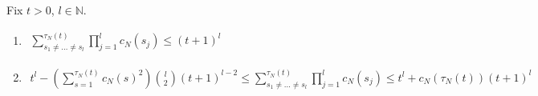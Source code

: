 \begin{lemma}\label{thm:sumprod1}
Fix $t>0$, $l\in\mathbb{N}$.
\begin{enumerate}[label=(\alph*)]
\item \label{thm:sumprod1_a} \hspace{1cm}
$\begin{aligned}
\sum_{s_1\neq\dots\neq s_l}^{\tau_N(t)} \prod_{j=1}^l c_N(s_j)
\leq (t+1)^l
\end{aligned}$
\item \label{thm:sumprod1_b} \hspace{1cm}
$\begin{aligned}
t^l - \left( \sum_{s=1}^{\tau_N(t)} c_N(s)^2 \right) \binom{l}{2} (t+1)^{l-2} 
\leq \sum_{s_1\neq\dots\neq s_l}^{\tau_N(t)} \prod_{j=1}^l c_N(s_j)
\leq t^l + c_N(\tau_N(t)) (t+1)^l
\end{aligned}$
\end{enumerate}
\end{lemma}

